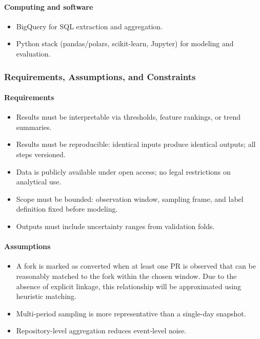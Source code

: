 \paragraph{Computing and software}
\begin{itemize}
  \item BigQuery for SQL extraction and aggregation.
  \item Python stack (pandas/polars, scikit-learn, Jupyter) for modeling and evaluation.
\end{itemize}

\subsubsection{Requirements, Assumptions, and Constraints}
\paragraph{Requirements}
\begin{itemize}
  \item Results must be interpretable via thresholds, feature rankings, or trend summaries.
  \item Results must be reproducible: identical inputs produce identical outputs; all steps versioned.
  \item Data is publicly available under open access; no legal restrictions on analytical use.
  \item Scope must be bounded: observation window, sampling frame, and label definition fixed before modeling.
  \item Outputs must include uncertainty ranges from validation folds.
\end{itemize}

\paragraph{Assumptions}
\begin{itemize}
  \item A fork is marked as converted when at least one PR is observed that can be reasonably matched to the fork within the chosen window. Due to the absence of explicit linkage, this relationship will be approximated using heuristic matching.
  \item Multi-period sampling is more representative than a single-day snapshot.
  \item Repository-level aggregation reduces event-level noise.
\end{itemize}

